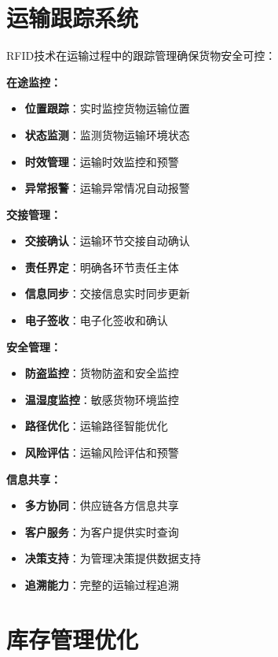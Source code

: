 \documentclass[12pt,UTF8]{ctexbook}
\begin{document}
\begin{itemize}[leftmargin=3.5em]
\begin{itemize}[leftmargin=3.5em]
\section{运输跟踪系统}

RFID技术在运输过程中的跟踪管理确保货物安全可控：

\textbf{在途监控：}
\begin{itemize}[leftmargin=3.5em]
    \item \textbf{位置跟踪}：实时监控货物运输位置
    \item \textbf{状态监测}：监测货物运输环境状态
    \item \textbf{时效管理}：运输时效监控和预警
    \item \textbf{异常报警}：运输异常情况自动报警
\end{itemize}

\textbf{交接管理：}
\begin{itemize}[leftmargin=3.5em]
    \item \textbf{交接确认}：运输环节交接自动确认
    \item \textbf{责任界定}：明确各环节责任主体
    \item \textbf{信息同步}：交接信息实时同步更新
    \item \textbf{电子签收}：电子化签收和确认
\end{itemize}

\textbf{安全管理：}
\begin{itemize}[leftmargin=3.5em]
    \item \textbf{防盗监控}：货物防盗和安全监控
    \item \textbf{温湿度监控}：敏感货物环境监控
    \item \textbf{路径优化}：运输路径智能优化
    \item \textbf{风险评估}：运输风险评估和预警
\end{itemize}

\textbf{信息共享：}
\begin{itemize}[leftmargin=3.5em]
    \item \textbf{多方协同}：供应链各方信息共享
    \item \textbf{客户服务}：为客户提供实时查询
    \item \textbf{决策支持}：为管理决策提供数据支持
    \item \textbf{追溯能力}：完整的运输过程追溯
\end{itemize}

\section{库存管理优化}


\end{itemize}
\end{itemize}
\end{document}
